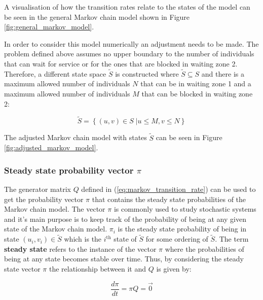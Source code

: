 A visualisation of how the transition rates relate to the states of the model
can be seen in the general Markov chain model shown in Figure
\ref{fig:general_markov_model}.




In order to consider this model numerically an adjustment needs to be made.
The problem defined above assumes no upper boundary to the number of individuals
that can wait for service or for the ones that are blocked in waiting zone 2.
Therefore, a different state space \( \tilde S \) is constructed where
\( \tilde S \subseteq S \) and there is a maximum allowed number of individuals
\(N\) that can be in waiting zone 1 and a maximum allowed number of individuals
\(M\) that can be blocked in waiting zone 2:

\begin{equation}\label{eq:truncated_state_space}
    \tilde S = \left\{ (u, v) \in S\;| u \leq M, v\leq N \right\}
\end{equation}

The adjusted Markov chain model with states \(\tilde S\) can be seen in Figure
\ref{fig:adjusted_markov_model}.





\subsubsection{Steady state probability vector \(\pi\)}

The generator matrix \( Q \) defined in (\ref{eq:markov_transition_rate}) can
be used to get the probability vector \( \pi \) that contains the steady state
probabilities of the Markov chain model.
The vector \( \pi \) is commonly used to study stochastic systems and it's main
purpose is to keep track of the probability of being at any given state of
the Markov chain model.
\(\pi_i\) is the steady state probability of being in state \((u_i, v_i) \in
\tilde S\) which is the \(i^{\text{th}}\) state of \(\tilde S\) for some
ordering of \(\tilde S\).
The term \textbf{steady state} refers to the instance of the vector \( \pi \)
where the probabilities of being at any state becomes stable over time.
Thus, by considering the steady state vector \( \pi \) the relationship between
it and \( Q \) is given by:

\begin{equation}\label{eq:steady_state_from_generator_matrix}
    \frac{d\pi}{dt} = \pi Q = \vec{0}
\end{equation}


